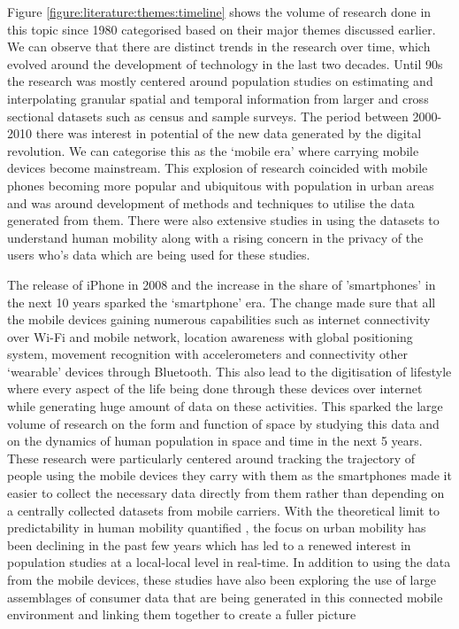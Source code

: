 Figure \ref{figure:literature:themes:timeline} shows the volume of research done in this topic since 1980 categorised based on their major themes discussed earlier.
We can observe that there are distinct trends in the research over time, which evolved around the development of technology in the last two decades.
Until 90s the research was mostly centered around population studies on estimating and interpolating granular spatial and temporal information from larger and cross sectional datasets such as census and sample surveys.
The period between 2000-2010 there was interest in potential of the new data generated by the digital revolution. 
We can categorise this as the `mobile era' where carrying mobile devices become mainstream.
This explosion of research coincided with mobile phones becoming more popular and ubiquitous with population in urban areas and was around development of methods and techniques to utilise the data generated from them.
There were also extensive studies in using the datasets to understand human mobility along with a rising concern in the privacy of the users who's data which are being used for these studies.


The release of iPhone in 2008 and the increase in the share of 'smartphones' in the next 10 years sparked the `smartphone' era. 
The change made sure that all the mobile devices gaining numerous capabilities such as internet connectivity over Wi-Fi and mobile network, location awareness with global positioning system, movement recognition with accelerometers and connectivity other `wearable' devices through Bluetooth.
This also lead to the digitisation of lifestyle where every aspect of the life being done through these devices over internet while generating huge amount of data on these activities.
This sparked the large volume of research on the form and function of space by studying this data and on the dynamics of human population in space and time in the next 5 years.
These research were particularly centered around tracking the trajectory of people using the mobile devices they carry with them as the smartphones made it easier to collect the necessary data directly from them rather than depending on a centrally collected datasets from mobile carriers. 
With the theoretical limit to predictability in human mobility quantified \cite{song2010limits}, the focus on urban mobility has been declining in the past few years which has led to a renewed interest in population studies at a local-local level in real-time.
In addition to using the data from the mobile devices, these studies have also been exploring the use of large assemblages of consumer data that are being generated in this connected mobile environment and linking them together to create a fuller picture \cite{cdrc2018}

